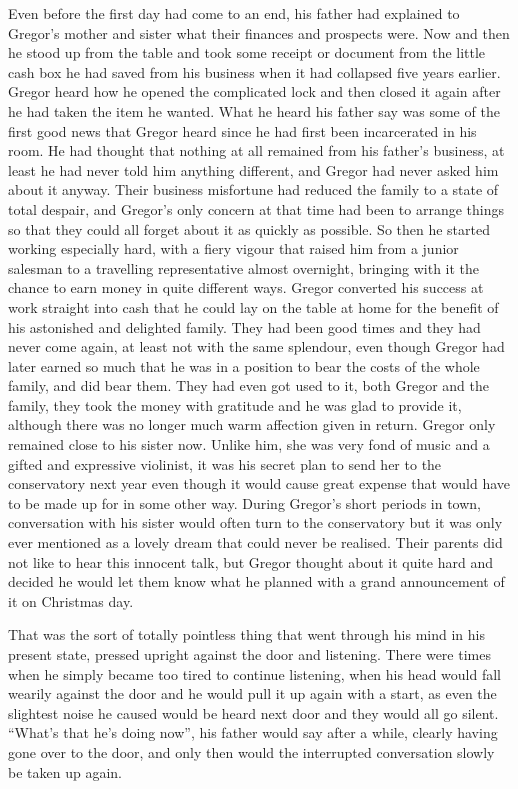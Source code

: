 Even before the first day had come to an end, his father had explained
to Gregor’s mother and sister what their finances and prospects were.
Now and then he stood up from the table and took some receipt or
document from the little cash box he had saved from his business when
it had collapsed five years earlier. Gregor heard how he opened the
complicated lock and then closed it again after he had taken the item
he wanted. What he heard his father say was some of the first good news
that Gregor heard since he had first been incarcerated in his room. He
had thought that nothing at all remained from his father’s business, at
least he had never told him anything different, and Gregor had never
asked him about it anyway. Their business misfortune had reduced the
family to a state of total despair, and Gregor’s only concern at that
time had been to arrange things so that they could all forget about it
as quickly as possible. So then he started working especially hard,
with a fiery vigour that raised him from a junior salesman to a
travelling representative almost overnight, bringing with it the chance
to earn money in quite different ways. Gregor converted his success at
work straight into cash that he could lay on the table at home for the
benefit of his astonished and delighted family. They had been good
times and they had never come again, at least not with the same
splendour, even though Gregor had later earned so much that he was in a
position to bear the costs of the whole family, and did bear them. They
had even got used to it, both Gregor and the family, they took the
money with gratitude and he was glad to provide it, although there was
no longer much warm affection given in return. Gregor only remained
close to his sister now. Unlike him, she was very fond of music and a
gifted and expressive violinist, it was his secret plan to send her to
the conservatory next year even though it would cause great expense
that would have to be made up for in some other way. During Gregor’s
short periods in town, conversation with his sister would often turn to
the conservatory but it was only ever mentioned as a lovely dream that
could never be realised. Their parents did not like to hear this
innocent talk, but Gregor thought about it quite hard and decided he
would let them know what he planned with a grand announcement of it on
Christmas day.

That was the sort of totally pointless thing that went through his mind
in his present state, pressed upright against the door and listening.
There were times when he simply became too tired to continue listening,
when his head would fall wearily against the door and he would pull it
up again with a start, as even the slightest noise he caused would be
heard next door and they would all go silent. “What’s that he’s doing
now”, his father would say after a while, clearly having gone over to
the door, and only then would the interrupted conversation slowly be
taken up again.

